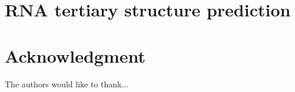 \documentclass[journal]{IEEEtran}
\begin{document}
\section{RNA tertiary structure prediction}
\label{sec:rna-tertiary-structure}






%


\appendices
%


\section*{Acknowledgment}


The authors would like to thank...
\end{document}
